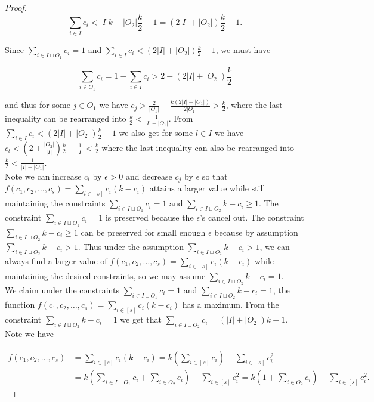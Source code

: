 \documentclass{article}
\begin{document}
\begin{proof}
$$\sum_{i \in I} c_i < |I|k + |O_2|\frac{k}{2} - 1 = (2|I| + |O_2|)\frac{k}{2}-1. $$ 

Since $\sum_{i \in I \sqcup O_1} c_i = 1$ and $\sum_{i \in I} c_i < (2|I| + |O_2|)\frac{k}{2}-1$, we must have 

$$\sum_{i \in O_1} c_i = 1-\sum_{i \in I} c_i > 2-(2|I| + |O_2|)\frac{k}{2}$$

\noindent
and thus for some $j \in O_1$ we have $c_j > \frac{2}{|O_1|} - \frac{k(2|I|+|O_1|)}{2|O_1|} > \frac{k}{2}$, where the last inequality can be rearranged into $\frac{k}{2} < \frac{1}{|I|+|O_1|}$. From $\sum_{i \in I} c_i <  (2|I| + |O_2|)\frac{k}{2}-1 $ we also get for some $l \in I$ we have $c_l < (2+\frac{|O_2|}{|I|})\frac{k}{2} - \frac{1}{|I|} < \frac{k}{2}$ where the last inequality can also be rearranged into $\frac{k}{2} < \frac{1}{|I|+|O_1|}$. \\

Note we can increase $c_l$ by $\epsilon > 0$ and decrease $c_j$ by $\epsilon$ so that $f(c_1,c_2,\ldots,c_{s}) = \sum_{i \in [s]} c_i(k-c_i)$ attains a larger value while still maintaining the constraints $\sum_{i \in I \sqcup O_1} c_i = 1$ and $\sum_{i \in I \sqcup O_2 } k-c_i \geq 1$. The constraint $\sum_{i \in I \sqcup O_1} c_i = 1$ is preserved because the $\epsilon$'s cancel out. The constraint $\sum_{i \in I \sqcup O_2 } k-c_i \geq 1$ can be preserved for small enough $\epsilon$ because by assumption $\sum_{i \in I \sqcup O_2 } k-c_i > 1$. Thus under the assumption $\sum_{i \in I \sqcup O_2 } k-c_i > 1$, we can always find a larger value of $f(c_1,c_2,\ldots,c_{s}) = \sum_{i \in [s]} c_i(k-c_i)$ while maintaining the desired constraints, so we may assume $\sum_{i \in I \sqcup O_2} k-c_i = 1$. \\

We claim under the constraints $\sum_{i \in I \sqcup O_1} c_i = 1$ and $\sum_{i \in I \sqcup O_2 } k-c_i = 1$, the function $f(c_1,c_2,\ldots,c_{s}) = \sum_{i \in [s]} c_i(k-c_i)$ has a maximum. From the constraint $\sum_{i \in I \sqcup O_2 } k-c_i = 1$ we get that $\sum_{i \in I \sqcup O_2} c_i = (|I| + |O_2|)k-1$. Note we have

\begin{align*}
f(c_1,c_2,\ldots,c_{s}) &= \sum_{i \in [s]} c_i(k-c_i) = k \left( \sum_{i \in [s]} c_i \right) - \sum_{i \in [s]} c_i^2 \\
&= k \left( \sum_{i \in I \sqcup O_1} c_i + \sum_{i \in O_2} c_i \right) - \sum_{i \in [s]} c_i^2 = k \left( 1+ \sum_{i \in O_2} c_i \right) - \sum_{i \in [s]} c_i^2.
\end{align*}


\end{proof}
\end{document}
